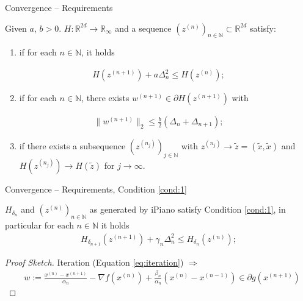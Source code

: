 \documentclass[t]{beamer}
\begin{document}
	\begin{frame}{Convergence -- Requirements}
		\begin{definition}
			Given $a$, $b > 0$. $H:\mathbb{R}^{2d} \rightarrow \mathbb{R}_\infty$ and a sequence $(z^{(n)})_{n \in \mathbb{N}} \subset \mathbb{R}^{2d}$ satisfy:
			
			\begin{enumerate}[label=(H\arabic*)]
				\item if for each $n \in \mathbb{N}$, it holds\label{cond:1}
			\end{enumerate}
			\begin{align}
				H(z^{(n + 1)}) + a\Delta_n^2 \leq H(z^{(n)});
			\end{align}
			
			\pause
			\begin{enumerate}[label=(H\arabic*)]
				\setcounter{enumi}{1}
				\item if for each $n \in \mathbb{N}$, there exists $w^{(n + 1)} \in \partial H(z^{(n + 1)})$ with\label{cond:2}
			\end{enumerate}
			\begin{align}
				\|w^{(n + 1)}\|_2 \leq \frac{b}{2}(\Delta_n + \Delta_{n + 1});
			\end{align}
			
			\pause
			\begin{enumerate}[label=(H\arabic*)]
				\setcounter{enumi}{2}
				\item if there exists a subsequence $(z^{(n_j)})_{j \in \mathbb{N}}$ with\label{cond:3} $z^{(n_j)} \rightarrow \tilde{z} = (\tilde{x}, \tilde{x})$ and $H(z^{(n_j)}) \rightarrow H(\tilde{z})$ for $j \rightarrow \infty$.
			\end{enumerate}\label{def:conditions}
		\end{definition}
	\end{frame}
	
	\begin{frame}{Convergence -- Requirements, Condition \ref{cond:1}}
		\begin{lemma}
			$H_{\delta_n}$ and $(z^{(n)})_{n \in \mathbb{N}}$ as generated by iPiano satisfy Condition \ref{cond:1}, in particular for each $n \in \mathbb{N}$ it holds
			\begin{align}
				H_{\delta_{n + 1}}(z^{(n + 1)}) + \gamma_n\Delta_n^2 \leq H_{\delta_n}(z^{(n)});
			\end{align}
		\end{lemma}
		
		\pause
		\begin{proof}[Proof Sketch]
			Iteration (Equation \eqref{eq:iteration}) $\Rightarrow$
			\begin{align}
				&w:= \frac{x^{(n)} - x^{(n + 1)}}{\alpha_n} - \nabla f(x^{(n)}) + \frac{\beta_n}{\alpha_n} (x^{(n)} - x^{(n - 1)}) \in \partial g(x^{(n + 1)})
			\end{align}
		\end{proof}
	\end{frame}
	
\end{document}
